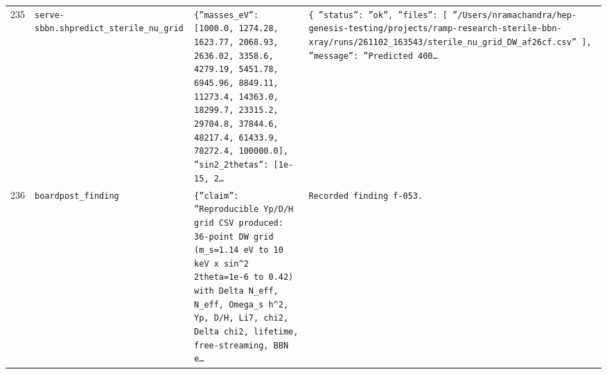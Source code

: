 \documentclass[11pt,a4paper]{article}
\begin{document}
\begin{longtable}{@{}p{}p{}p{}p{}@{}}
235 & \texttt{serve-sbbn.sh}\newline\texttt{predict\_\allowbreak{}sterile\_\allowbreak{}nu\_\allowbreak{}grid} & \texttt{\{''masses\_\allowbreak{}eV'':\allowbreak{} [1000.0,\allowbreak{} 1274.28,\allowbreak{} 1623.77,\allowbreak{} 2068.93,\allowbreak{} 2636.02,\allowbreak{} 3358.6,\allowbreak{} 4279.19,\allowbreak{} 5451.78,\allowbreak{} 6945.96,\allowbreak{} 8849.11,\allowbreak{} 11273.4,\allowbreak{} 14363.0,\allowbreak{} 18299.7,\allowbreak{} 23315.2,\allowbreak{} 29704.8,\allowbreak{} 37844.6,\allowbreak{} 48217.4,\allowbreak{} 61433.9,\allowbreak{} 78272.4,\allowbreak{} 100000.0]\allowbreak{},\allowbreak{} ''sin2\_\allowbreak{}2thetas'':\allowbreak{} [1e-15,\allowbreak{} 2\ldots{}\allowbreak{}} & \texttt{\{   ''status'':\allowbreak{} ''ok'',\allowbreak{}   ''files'':\allowbreak{} [     ''/\allowbreak{}Users/\allowbreak{}nramachandra/\allowbreak{}hep-genesis-testing/\allowbreak{}projects/\allowbreak{}ramp-research-sterile-bbn-xray/\allowbreak{}runs/\allowbreak{}261102\_\allowbreak{}163543/\allowbreak{}sterile\_\allowbreak{}nu\_\allowbreak{}grid\_\allowbreak{}DW\_\allowbreak{}af26cf.csv''   ]\allowbreak{},\allowbreak{}   ''message'':\allowbreak{} ''Predicted 400\ldots{}\allowbreak{}} \\
236 & \texttt{board}\newline\texttt{post\_\allowbreak{}finding} & \texttt{\{''claim'':\allowbreak{} ''Reproducible Yp/\allowbreak{}D/\allowbreak{}H grid CSV produced:\allowbreak{} 36-point DW grid (m\_\allowbreak{}s=\allowbreak{}1.14 eV to 10 keV x sin\textasciicircum{}\allowbreak{}2 2theta=\allowbreak{}1e-6 to 0.42)\allowbreak{} with Delta N\_\allowbreak{}eff,\allowbreak{} N\_\allowbreak{}eff,\allowbreak{} Omega\_\allowbreak{}s h\textasciicircum{}\allowbreak{}2,\allowbreak{} Yp,\allowbreak{} D/\allowbreak{}H,\allowbreak{} Li7,\allowbreak{} chi2,\allowbreak{} Delta chi2,\allowbreak{} lifetime,\allowbreak{} free-streaming,\allowbreak{} BBN e\ldots{}\allowbreak{}} & \texttt{Recorded finding f-053.} \\

\end{longtable}
\end{document}
